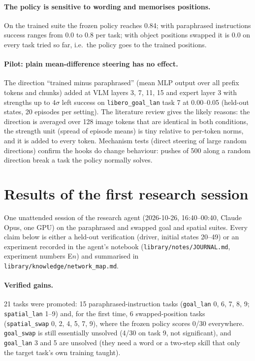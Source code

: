 \documentclass[11pt]{article}
\begin{document}
\paragraph{The policy is sensitive to wording and memorises positions.} On the trained suite the frozen policy reaches 0.84; with
paraphrased instructions success ranges from 0.0 to 0.8 per task; with object positions swapped it is 0.0 on every task tried so
far, i.e.\ the policy goes to the trained positions.

\paragraph{Pilot: plain mean-difference steering has no effect.} The direction ``trained minus paraphrased'' (mean MLP output over
all prefix tokens and chunks) added at VLM layers 3, 7, 11, 15 and expert layer 3 with strengths up to $4\sigma$ left success on
\texttt{libero\_goal\_lan} task 7 at 0.00--0.05 (held-out states, 20 episodes per setting). The literature review gives the likely
reasons: the direction is averaged over 128 image tokens that are identical in both conditions, the strength unit (spread of
episode means) is tiny relative to per-token norms, and it is added to every token. Mechanism tests (direct steering of large random
directions) confirm the hooks do change behaviour: pushes of 500 along a random direction break a task the policy normally solves.

\section{Results of the first research session}\label{sec:session1}
One unattended session of the research agent (2026-10-26, 16:40--00:40, Claude Opus, one GPU) on the paraphrased and swapped
goal and spatial suites. Every claim below is either a held-out verification (driver, initial states 20--49) or an experiment
recorded in the agent's notebook (\texttt{library/notes/JOURNAL.md}, experiment numbers E$n$) and summarised in
\texttt{library/knowledge/network\_map.md}.



\paragraph{Verified gains.} 21 tasks were promoted: 15 paraphrased-instruction tasks (\texttt{goal\_lan} 0, 6, 7, 8, 9;
\texttt{spatial\_lan} 1--9) and, for the first time, 6 swapped-position tasks (\texttt{spatial\_swap} 0, 2, 4, 5, 7, 9), where the
frozen policy scores 0/30 everywhere. \texttt{goal\_swap} is still essentially unsolved (4/30 on task 9, not significant), and
\texttt{goal\_lan} 3 and 5 are unsolved (they need a word or a two-step skill that only the target task's own training taught).
\end{document}
